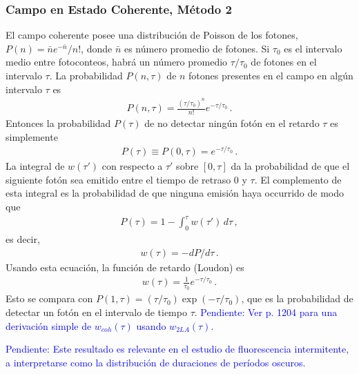 \documentclass[twocolumn,aps,eqsecnum,showkeys,amsmath]{revtex4}
\begin{document}
\subsubsection{Campo en Estado Coherente, M\'etodo 2 \cite{KiKn89}} 
El campo coherente posee una distribuci\'on de Poisson de los fotones,  
$P(n) = \bar{n} e^{-\bar{n}} /n!$, donde $\bar{n}$ es n\'umero promedio 
de fotones. Si $\tau_0$ es el intervalo medio entre fotoconteos, habr\'a 
un n\'umero promedio $\tau/\tau_0$ de fotones en el intervalo $\tau$. 
La probabilidad $P(n, \tau)$ de $n$ fotones presentes en el campo en 
alg\'un intervalo $\tau$ es 
%
\begin{eqnarray}
P(n,\tau) = \frac{ (\tau/\tau_0)^n }{n!} e^{ -\tau/\tau_0} \,.
\end{eqnarray}
Entonces la probabilidad $P(\tau)$ de no detectar ning\'un fot\'on en el 
retardo $\tau$ es simplemente
%
\begin{eqnarray}
P(\tau) \equiv P(0,\tau) = e^{ -\tau/\tau_0} \,.
\end{eqnarray}
La integral de $w(\tau')$ con respecto a $\tau'$  sobre $[0,\tau]$ da la 
probabilidad de que el siguiente fot\'on sea emitido entre el tiempo de 
retraso 0 y $\tau$. El complemento de esta integral es la probabilidad de que 
ninguna emisi\'on haya occurrido de modo que 
%
\begin{eqnarray}
P(\tau) = 1 - \int_0^{\tau} w (\tau') \,d\tau \,,
\end{eqnarray}
es decir, 
%
\begin{eqnarray}
w(\tau) = -dP/d\tau \,.
\end{eqnarray}
Usando esta ecuaci\'on, la funci\'on de retardo (Loudon) es 
%
\begin{eqnarray}
w(\tau) = \frac{1}{\tau_0} e^{-\tau/\tau_0} \,.
\end{eqnarray}
Esto se compara con $P(1,\tau) = (\tau/\tau_0) \exp{(-\tau/\tau_0)}$, 
que es la probabilidad de detectar un fot\'on en el intervalo de tiempo 
$\tau$. \textcolor{blue}{Pendiente: Ver \cite{CSVR89} p. 1204 para una 
derivaci\'on simple de $w_{coh}(\tau)$ usando $w_{2LA}(\tau)$. }

\textcolor{blue}{Pendiente: Este resultado es relevante en el estudio de 
fluorescencia intermitente, a interpretarse como la distribuci\'on de 
duraciones de per\'iodos oscuros. }
\end{document}
